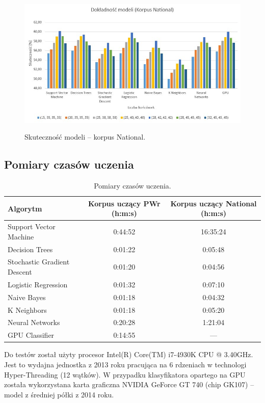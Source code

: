 \begin{figure}[H]
	\centering
	\includegraphics[width=\linewidth]{charts/korpusnationalwykres}
	\label{Rysunek}
	\caption{Skuteczność modeli -- korpus National.}
\end{figure}

\newpage
\subsection{Pomiary czasów uczenia}

\begin{table}[H]
	\centering
	\caption{Pomiary czasów uczenia.}
	\smallskip
	\begin{tabular}{lcc}
		\toprule
		\textbf{Algorytm} & \textbf{Korpus uczący PWr (h:m:s)} &  \textbf{Korpus uczący National (h:m:s)} \\
		\midrule
		Support Vector Machine & 0:44:52 & 16:35:24 \\
		Decision Trees & 0:01:22 & 0:05:48 \\
		Stochastic Gradient Descent & 0:01:20 & 0:04:56 \\
		Logistic Regression & 0:01:32 & 0:07:10 \\
		Naive Bayes & 0:01:18 & 0:04:32 \\
		K Neighbors & 0:01:18 & 0:05:20 \\
		Neural Networks & 0:20:28 & 1:21:04 \\
		GPU Classifier & 0:14:55 & --- \\
		\bottomrule
	\end{tabular}
\end{table}
Do testów został użyty procesor Intel(R) Core(TM) i7-4930K CPU @ 3.40GHz. Jest to wydajna jednostka z 2013 roku pracująca na 6 rdzeniach w technologi Hyper-Threading (12 wątków).
W przypadku klasyfikatora opartego na GPU została wykorzystana karta graficzna NVIDIA GeForce GT 740 (chip GK107) -- model z średniej półki z 2014 roku.

